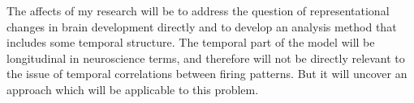 \documentclass[a4paper,12pt]{article}
\theoremstyle{definition}
\begin{document}
	The affects of my research will be to address the question of representational changes in brain development directly and to develop an analysis method that includes some temporal structure. The temporal part of the model will be longitudinal in neuroscience terms, and therefore will not be directly relevant to the issue of temporal correlations between firing patterns. But it will uncover an approach which will be applicable to this problem.

\newpage

\end{document}
